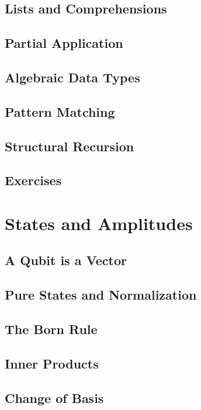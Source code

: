\documentclass[11pt,a4paper]{article}
\begin{document}
\subsection{Lists and Comprehensions}

\subsection{Partial Application}

\subsection{Algebraic Data Types}

\subsection{Pattern Matching}

\subsection{Structural Recursion}

\subsection{Exercises}


\section{States and Amplitudes}

\subsection{A Qubit is a Vector}

\subsection{Pure States and Normalization}

\subsection{The Born Rule}

\subsection{Inner Products}

\subsection{Change of Basis}
\end{document}
